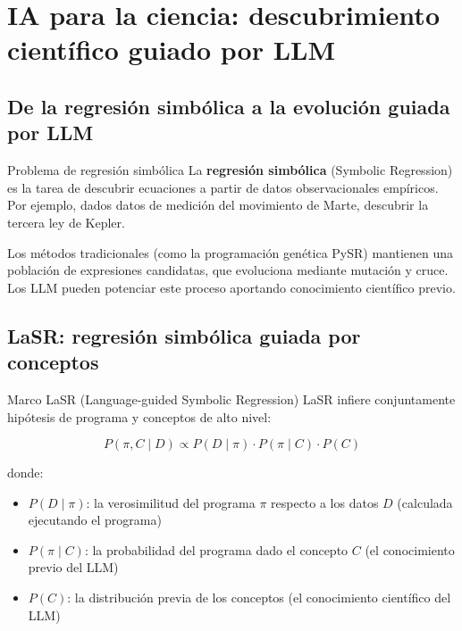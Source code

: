 \section{IA para la ciencia: descubrimiento científico guiado por LLM}

\subsection{De la regresión simbólica a la evolución guiada por LLM}

\begin{knowledgebox}{Problema de regresión simbólica}
La \textbf{regresión simbólica} (Symbolic Regression) es la tarea de descubrir ecuaciones a partir de datos observacionales empíricos. Por ejemplo, dados datos de medición del movimiento de Marte, descubrir la tercera ley de Kepler.

Los métodos tradicionales (como la programación genética PySR) mantienen una población de expresiones candidatas, que evoluciona mediante mutación y cruce. Los LLM pueden potenciar este proceso aportando conocimiento científico previo.
\end{knowledgebox}

\subsection{LaSR: regresión simbólica guiada por conceptos}

\begin{importantbox}{Marco LaSR (Language-guided Symbolic Regression)}
LaSR infiere conjuntamente hipótesis de programa y conceptos de alto nivel:

$$P(\pi, C \mid D) \propto P(D \mid \pi) \cdot P(\pi \mid C) \cdot P(C)$$

donde:
\begin{itemize}
    \item $P(D \mid \pi)$: la verosimilitud del programa $\pi$ respecto a los datos $D$ (calculada ejecutando el programa)
    \item $P(\pi \mid C)$: la probabilidad del programa dado el concepto $C$ (el conocimiento previo del LLM)
    \item $P(C)$: la distribución previa de los conceptos (el conocimiento científico del LLM)
\end{itemize}
\end{importantbox}


